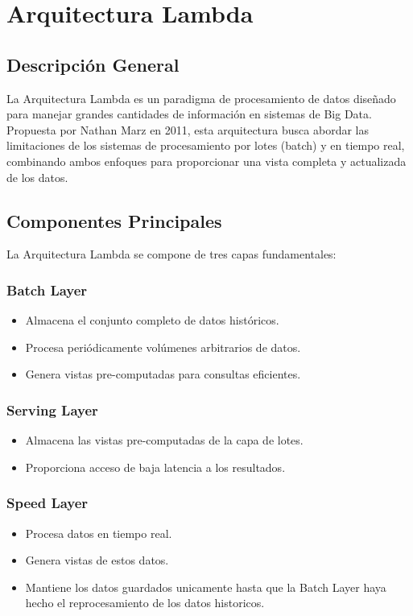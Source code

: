 \section{Arquitectura Lambda}

\subsection{Descripción General}
La Arquitectura Lambda es un paradigma de procesamiento de datos diseñado para manejar grandes cantidades de información en sistemas de Big Data. 
Propuesta por Nathan Marz en 2011, esta arquitectura busca abordar las limitaciones de los sistemas de procesamiento por lotes (batch) y en tiempo real, 
combinando ambos enfoques para proporcionar una vista completa y actualizada de los datos.

\subsection{Componentes Principales}
La Arquitectura Lambda se compone de tres capas fundamentales:

\subsubsection{Batch Layer}
\begin{itemize}
\item Almacena el conjunto completo de datos históricos.
\item Procesa periódicamente volúmenes arbitrarios de datos.
\item Genera vistas pre-computadas para consultas eficientes.
\end{itemize}

\subsubsection{Serving Layer}
\begin{itemize}
\item Almacena las vistas pre-computadas de la capa de lotes.
\item Proporciona acceso de baja latencia a los resultados.
\end{itemize}

\subsubsection{Speed Layer}
\begin{itemize}
\item Procesa datos en tiempo real.
\item Genera vistas de estos datos.
\item Mantiene los datos guardados unicamente hasta que la Batch Layer haya hecho el reprocesamiento de los datos historicos.
\end{itemize}

